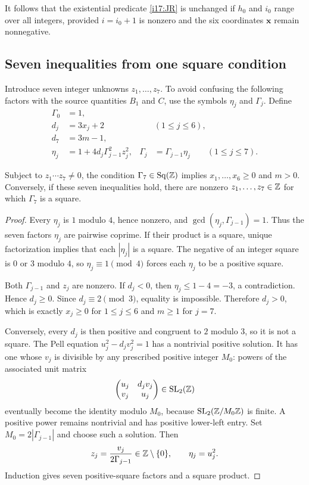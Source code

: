 It follows that the existential predicate \eqref{i17:JR} is unchanged
if $h_0$ and $i_0$ range over all integers, provided $i=i_0+1$ is
nonzero and the six coordinates $\mathbf x$ remain nonnegative.

\subsection{Seven inequalities from one square condition}

Introduce seven integer unknowns $z_1,\ldots,z_7$. To avoid confusing
the following factors with the source quantities $B_1$ and $C$, use
the symbols $\eta_j$ and $\Gamma_j$.
Define
\begin{equation}
 \begin{aligned}
 \Gamma_0&=1,\\
 d_j&=3x_j+2 &&(1\le j\le6),\\
 d_7&=3m-1,\\
 \eta_j&=1+4d_j\Gamma_{j-1}^2z_j^2,
 &\Gamma_j&=\Gamma_{j-1}\eta_j\qquad(1\le j\le7).
 \end{aligned}
 \label{i17:stack}
\end{equation}

\begin{lemma}
\label{i17:pell-stack}
Subject to $z_1\cdots z_7\ne0$, the condition
$\Gamma_7\in\operatorname{Sq}(\mathbb Z)$ implies
$x_1,\ldots,x_6\ge0$ and $m>0$.
Conversely, if these seven inequalities hold, there are nonzero
$z_1,\ldots,z_7\in\mathbb Z$ for which $\Gamma_7$ is a square.
\end{lemma}
\begin{proof}
Every $\eta_j$ is $1$ modulo $4$, hence nonzero, and
$\gcd(\eta_j,\Gamma_{j-1})=1$. Thus the seven factors $\eta_j$ are
pairwise coprime. If their product is a square, unique factorization
implies that each $|\eta_j|$ is a square. The negative of an integer
square is $0$ or $3$ modulo $4$, so $\eta_j\equiv1\pmod4$ forces
each $\eta_j$ to be a positive square.

Both $\Gamma_{j-1}$ and $z_j$ are nonzero. If $d_j<0$, then
$\eta_j\le1-4=-3$, a contradiction. Hence $d_j\ge0$.
Since $d_j\equiv2\pmod3$, equality is impossible. Therefore
$d_j>0$, which is exactly $x_j\ge0$ for $1\le j\le6$ and
$m\ge1$ for $j=7$.

Conversely, every $d_j$ is then positive and congruent to $2$ modulo
$3$, so it is not a square. The Pell equation
$u_j^2-d_jv_j^2=1$ has a nontrivial positive solution.
It has one whose $v_j$ is divisible by any prescribed positive integer
$M_0$: powers of the associated unit matrix
\[
 \begin{pmatrix}u_j&d_jv_j\\v_j&u_j\end{pmatrix}
 \in\mathrm{SL}_2(\mathbb Z)
\]
eventually become the identity modulo $M_0$, because
$\mathrm{SL}_2(\mathbb Z/M_0\mathbb Z)$ is finite. A positive power remains
nontrivial and has positive lower-left entry. Set
$M_0=2|\Gamma_{j-1}|$ and choose such a solution. Then
\[
 z_j=\frac{v_j}{2\Gamma_{j-1}}\in\mathbb Z\setminus\{0\},
 \qquad \eta_j=u_j^2.
\]
Induction gives seven positive-square factors and a square product.
\end{proof}

